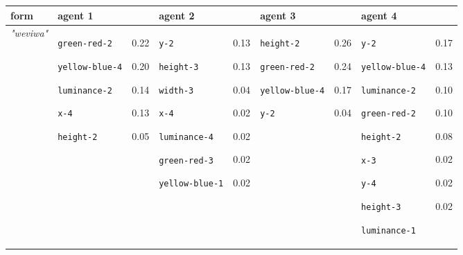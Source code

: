 
{\renewcommand{\arraystretch}{1.5}
\begin{tabular}{@{}p{0.95cm}|p{1.9cm}@{}p{0.6cm}@{}|p{1.9cm}@{}p{0.6cm}@{}|p{1.9cm}@{}p{0.6cm}@{}|p{1.9cm}@{}p{0.5cm}@{}}
form & agent 1 &  & agent 2 &  & agent 3 &  & agent 4 & \\
\hline
\textit{"weviwa"} & \texttt{green-red-2}

\texttt{yellow-blue-4}

\texttt{luminance-2}

\texttt{x-4}

\texttt{height-2} & 0.22

0.20

0.14

0.13

0.05 & \texttt{y-2}

\texttt{height-3}

\texttt{width-3}

\texttt{x-4}

\texttt{luminance-4}

\texttt{green-red-3}

\texttt{yellow-blue-1} & 0.13

0.13

0.04

0.02

0.02

0.02

0.02 & \texttt{height-2}

\texttt{green-red-2}

\texttt{yellow-blue-4}

\texttt{y-2} & 0.26

0.24

0.17

0.04 & \texttt{y-2}

\texttt{yellow-blue-4}

\texttt{luminance-2}

\texttt{green-red-2}

\texttt{height-2}

\texttt{x-3}

\texttt{y-4}

\texttt{height-3}

\texttt{luminance-1} & 0.17

0.13

0.10

0.10

0.08

0.02

0.02

0.02


\end{tabular}}
